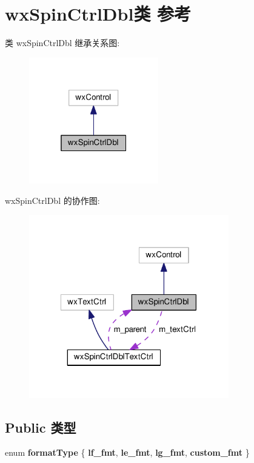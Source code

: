\hypertarget{classwx_spin_ctrl_dbl}{\section{wx\+Spin\+Ctrl\+Dbl类 参考}
\label{classwx_spin_ctrl_dbl}
}


类 wx\+Spin\+Ctrl\+Dbl 继承关系图\+:
\nopagebreak
\begin{figure}[H]
\begin{center}
\leavevmode
\includegraphics[width=160pt]{classwx_spin_ctrl_dbl__inherit__graph}
\end{center}
\end{figure}


wx\+Spin\+Ctrl\+Dbl 的协作图\+:
\nopagebreak
\begin{figure}[H]
\begin{center}
\leavevmode
\includegraphics[width=247pt]{classwx_spin_ctrl_dbl__coll__graph}
\end{center}
\end{figure}
\subsection*{Public 类型}
\begin{DoxyCompactItemize}
\item 
\hypertarget{classwx_spin_ctrl_dbl_ae36bd5024c6f4990df39e6e25a69f359}{enum {\bfseries format\+Type} \{ {\bfseries lf\+\_\+fmt}, 
{\bfseries le\+\_\+fmt}, 
{\bfseries lg\+\_\+fmt}, 
{\bfseries custom\+\_\+fmt}
 \}}\label{classwx_spin_ctrl_dbl_ae36bd5024c6f4990df39e6e25a69f359}

\end{DoxyCompactItemize}
